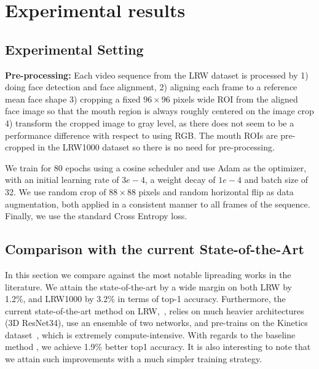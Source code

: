 \documentclass{article}
\begin{document}
\section{Experimental results}
\label{sec:experiments}



\subsection{Experimental Setting}

\textbf{Pre-processing:} Each video sequence from the LRW dataset is processed by 1) doing face detection and face alignment, 2) aligning each frame to a reference mean face shape 3) cropping a fixed $96\times 96$ pixels wide ROI from the aligned face image so that the mouth region is always roughly centered on the image crop 4) transform the cropped image to gray level, as there does not seem to be a performance difference with respect to using RGB. The mouth ROIs are pre-cropped in the LRW1000 dataset so there is no need for pre-processing.

We train for 80 epochs using a cosine scheduler and use Adam as the optimizer, with an initial learning rate of $3e-4$, a weight decay of $1e-4$ and batch size of 32. We use random crop of $88\times 88$ pixels and random horizontal flip as data augmentation, both applied in a consistent manner to all frames of the sequence. Finally, we use the standard Cross Entropy loss.






\subsection{Comparison with the current State-of-the-Art}

In this section we compare against the most notable lipreading works in the literature. We attain the state-of-the-art by a wide margin on both LRW by 1.2\%, and LRW1000 by 3.2\% in terms of top-1 accuracy. Furthermore, the current state-of-the-art method on LRW,~\cite{weng19}, relies on much heavier architectures (3D ResNet34), use an ensemble of two networks, and pre-trains on the Kinetics dataset~\cite{kinetics17}, which is extremely compute-intensive. With regards to the baseline method \cite{petridis18}, we achieve 1.9\% better top1 accuracy.
It is also interesting to note that we attain such improvements with a much simpler training strategy.
\end{document}
